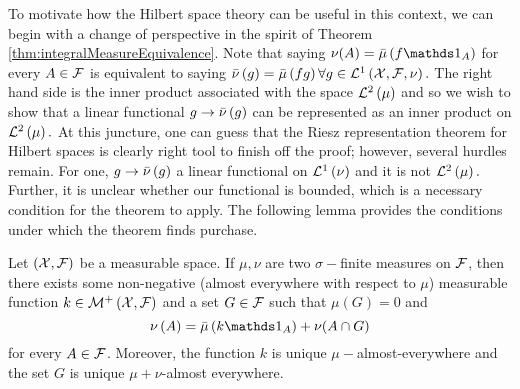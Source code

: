 To motivate how the Hilbert space theory can be useful in this context,
we can begin with a change of perspective in the spirit of Theorem
\ref{thm:integralMeasureEquivalence}. Note that saying $\nu(A)=\lebInt{\mu}{f\indicate_{A}}$
for every $A\in\mathcal{F}$ is equivalent to saying $\bar{\nu}\left(g\right)=\bar{\mu}\left(fg\right)\forall g\in\mathcal{L}^{1}\left(\mathcal{X},\mathcal{F},\nu\right).$
The right hand side is the inner product associated with the space
$\mathcal{L}^{2}\left(\mu\right)$ and so we wish to show that a linear functional $g\to\bar{\nu}\left(g\right)$
can be represented as an inner product on $\mathcal{L}^{2}\left(\mu\right).$ At this juncture,
one can guess that the Riesz representation theorem for Hilbert spaces
is clearly right tool to finish off the proof; however, several hurdles
remain. For one, $g\to\bar{\nu}\left(g\right)$ a linear functional on $\mathcal{L}^{1}\left(\nu\right)$
and it is not $\mathcal{L}^{2}\left(\mu\right).$ Further, it is unclear whether our functional
is bounded, which is a necessary condition for the theorem to apply.
The following lemma provides the conditions under which the theorem
finds purchase.
\begin{lem}
\label{lemma:LebesgueRadonNikodym}Let $\left(\mathcal{X},\mathcal{F}\right)$ be a
measurable space. If $\mu,\nu$ are two $\sigma-$finite measures
on $\mathcal{F}$, then there exists some non-negative (almost everywhere with
respect to $\mu$) measurable function $k\in\mathcal{M}^{+}\left(\mathcal{X},\mathcal{F}\right)$
and a set $G\in\mathcal{F}$ such that $\mu(G)=0$ and
\[
\nu\left(A\right)=\lebInt{\mu}{k\indicate_{A}}+\nu(A\cap G)
\]
for every $A\in\mathcal{F}$. Moreover, the function $k$ is unique $\mu-$almost-everywhere
and the set $G$ is unique $\mu+\nu$-almost everywhere.
\end{lem}


